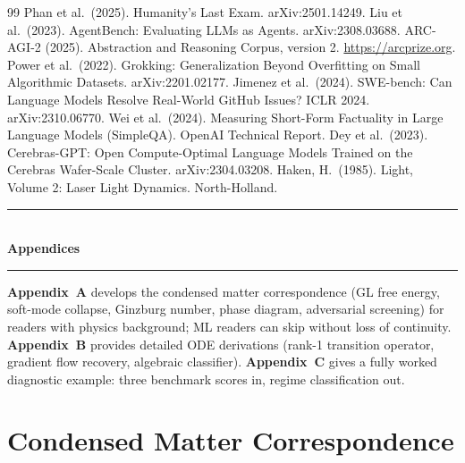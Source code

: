 \documentclass[11pt]{article}
\begin{document}
\begin{thebibliography}{99}
 Phan et al.\ (2025). Humanity's Last Exam. arXiv:2501.14249.
 Liu et al.\ (2023). AgentBench: Evaluating LLMs as Agents. arXiv:2308.03688.
 ARC-AGI-2 (2025). Abstraction and Reasoning Corpus, version 2. \url{https://arcprize.org}.
 Power et al.\ (2022). Grokking: Generalization Beyond Overfitting on Small Algorithmic Datasets. arXiv:2201.02177.
 Jimenez et al.\ (2024). SWE-bench: Can Language Models Resolve Real-World GitHub Issues? ICLR 2024. arXiv:2310.06770.
 Wei et al.\ (2024). Measuring Short-Form Factuality in Large Language Models (SimpleQA). OpenAI Technical Report.
 Dey et al.\ (2023). Cerebras-GPT: Open Compute-Optimal Language Models Trained on the Cerebras Wafer-Scale Cluster. arXiv:2304.03208.
 Haken, H.\ (1985). Light, Volume 2: Laser Light Dynamics. North-Holland.
\end{thebibliography}

\clearpage

\appendix
\renewcommand{\thesection}{\Alph{section}}
\renewcommand{\thesubsection}{\thesection\arabic{subsection}}
\renewcommand{\theequation}{\thesection\arabic{equation}}
\setcounter{equation}{0}

\begin{center}
\rule{0.8\textwidth}{0.4pt}\\[6pt]
{\Large\textbf{Appendices}}\\[4pt]
\rule{0.8\textwidth}{0.4pt}
\end{center}

\noindent\textbf{Appendix~A} develops the condensed matter correspondence (GL free energy, soft-mode collapse, Ginzburg number, phase diagram, adversarial screening) for readers with physics background; ML readers can skip without loss of continuity.
\textbf{Appendix~B} provides detailed ODE derivations (rank-1 transition operator, gradient flow recovery, algebraic classifier).
\textbf{Appendix~C} gives a fully worked diagnostic example: three benchmark scores in, regime classification out.

\section{Condensed Matter Correspondence}
\label{app:physics}
\end{document}
